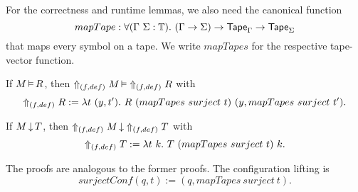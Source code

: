 For the correctness and runtime lemmas, we also need the canonical function
\[
  mapTape:\forall (\Tau~\Sigma:\Type).~(\Tau\to\Sigma)\to\Tape_\Tau\to\Tape_\Sigma
\]
that maps every symbol on a tape.  We write $mapTapes$ for the respective tape-vector function.

\begin{lemma}
  \label{lem:LiftAlphabet_Realise}
  If $M \Realise R$, then $\LiftAlphabet{M}{(f,def)} \Realise \LiftAlphabet{R}{(f,def)}$ with
  \[
    \LiftAlphabet{R}{(f,def)} := \lambda t~(y, t').~R~(mapTapes~surject~t)~(y, mapTapes~surject~t').
  \]
\end{lemma}

\begin{lemma}
  \label{lem:LiftAlphabet_TerminatesIn}
  If $M \TerminatesIn T$, then $\LiftAlphabet{M}{(f,def)} \TerminatesIn \LiftAlphabet{T}{(f,def)}$ with
  \[
    \LiftAlphabet{T}{(f,def)} := \lambda t~k.~T~(mapTapes~surject~t)~k.
  \]
\end{lemma}

The proofs are analogous to the former proofs.  The configuration lifting is
\[
  surjectConf (q,t) := (q, mapTapes~surject~t).
\]



